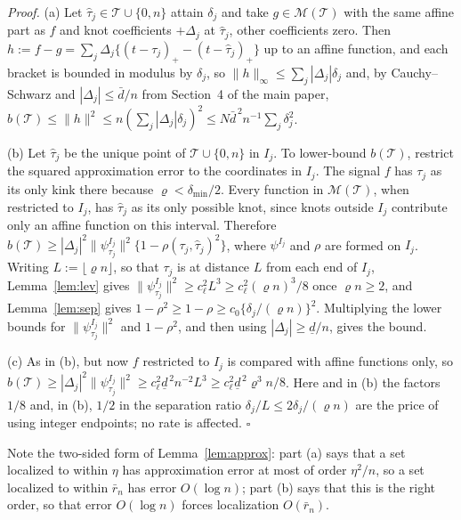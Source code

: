 \documentclass[12pt, a4paper]{article}
\newcommand{\qed}{\hfill$\square$}
\newenvironment{proof}[1][Proof]{\par\noindent\textit{#1.}\space}{\qed\par\medskip}
\begin{document}
\begin{proof}
(a) Let $\hat\tau_j \in \mathcal{T} \cup \{0,n\}$ attain $\delta_j$ and take $g \in \mathcal{M}(\mathcal{T})$ with the same affine part as $f$ and knot coefficients $+\Delta_j$ at $\hat\tau_j$, other coefficients zero. Then
$h := f - g = \sum_j \Delta_j\{(t-\tau_j)_+ - (t-\hat\tau_j)_+\}$ up to an
affine function, and each bracket is bounded in modulus by $\delta_j$, so
$\|h\|_\infty \le \sum_j |\Delta_j| \delta_j$ and, by Cauchy--Schwarz and $|\Delta_j| \le \bar d/n$ from Section~4 of the main paper, $b(\mathcal{T}) \le \|h\|^2 \le n (\sum_j |\Delta_j|\delta_j)^2 \le
N \bar d^{\,2} n^{-1} \sum_j \delta_j^2$.

(b) Let $\hat\tau_j$ be the unique point of
$\mathcal{T}\cup\{0,n\}$ in $I_j$. To lower-bound $b(\mathcal{T})$, restrict
the squared approximation error to the coordinates in $I_j$. The signal $f$
has $\tau_j$ as its only kink there because
$\varrho<\delta_{\min}/2$. Every function in
$\mathcal{M}(\mathcal{T})$, when restricted to $I_j$, has
$\hat\tau_j$ as its only possible knot, since knots outside $I_j$ contribute
only an affine function on this interval. Therefore
$b(\mathcal{T}) \ge |\Delta_j|^2 \|\psi^{I_j}_{\tau_j}\|^2
\{1 - \rho(\tau_j,\hat\tau_j)^2\}$, where $\psi^{I_j}$ and $\rho$ are formed on
$I_j$. Writing $L := \lfloor \varrho n\rfloor$, so that $\tau_j$ is at distance $L$ from each end of $I_j$, Lemma~\ref{lem:lev} gives $\|\psi^{I_j}_{\tau_j}\|^2 \ge c_\ell^2 L^3 \ge c_\ell^2 (\varrho n)^3/8$ once $\varrho n \ge 2$, and
Lemma~\ref{lem:sep} gives $1-\rho^2 \ge 1-\rho \ge
c_0 \{\delta_j/(\varrho n)\}^2$. Multiplying the lower bounds for
$\|\psi^{I_j}_{\tau_j}\|^2$ and $1-\rho^2$, and then using
$|\Delta_j| \ge \underline d/n$, gives the bound.

(c) As in (b), but now $f$ restricted to $I_j$ is compared with affine functions only, so $b(\mathcal{T}) \ge |\Delta_j|^2\|\psi^{I_j}_{\tau_j}\|^2 \ge c_\ell^2\underline d^{\,2} n^{-2} L^3 \ge c_\ell^2\underline d^{\,2}\varrho^3 n/8$. Here and in (b) the factors $1/8$ and, in (b), $1/2$ in the separation ratio $\delta_j/L \le 2\delta_j/(\varrho n)$ are the price of using integer endpoints; no rate is affected.
\end{proof}

Note the two-sided form of Lemma~\ref{lem:approx}: part (a) says that a set
localized to within $\eta$ has approximation error at most of order $\eta^2/n$,
so a set localized to within $\bar r_n$ has error $O(\log n)$; part (b) says
that this is the right order, so that error $O(\log n)$ forces localization
$O(\bar r_n)$. 
\end{document}
